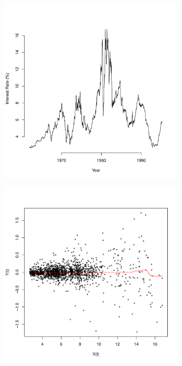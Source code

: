 \documentclass[12pt]{article}
\begin{document}
\begin{figure}[h]
\centering
    \begin{subfigure}[b]{0.4\textwidth}
        \centering
        \includegraphics[width=\textwidth]{figures_treasury_a.pdf}
        \caption{}
        \label{fig:tb_raw_data}
    \end{subfigure}
    \hfill
    \begin{subfigure}[b]{0.4\textwidth}
        \centering
        \includegraphics[width=\textwidth]{figures_treasury_b.pdf}
        \caption{}
        \label{fig:tb_res}
    \end{subfigure}


\end{figure}
\end{document}
